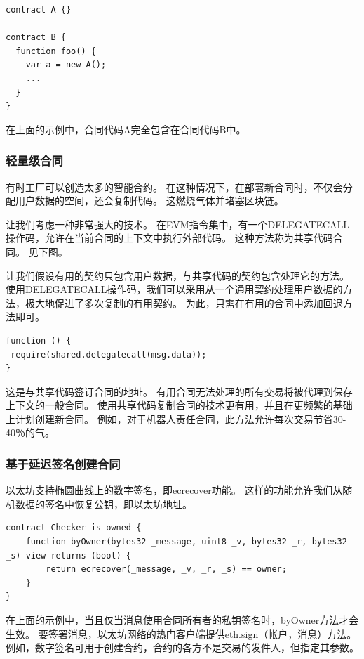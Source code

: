 \documentclass[UTF8]{article}
\begin{document}
\begin{lstlisting}
contract A {}

contract B {
  function foo() {
    var a = new A();
    ...
  }
}
\end{lstlisting}

在上面的示例中，合同代码A完全包含在合同代码B中。

\subsubsection{轻量级合同}

有时工厂可以创造太多的智能合约。 在这种情况下，在部署新合同时，不仅会分配用户数据的空间，还会复制代码。 这燃烧气体并堵塞区块链。

让我们考虑一种非常强大的技术。 在EVM指令集中，有一个DELEGATECALL操作码，允许在当前合同的上下文中执行外部代码。 这种方法称为共享代码合同。 见下图。

让我们假设有用的契约只包含用户数据，与共享代码的契约包含处理它的方法。 使用DELEGATECALL操作码，我们可以采用从一个通用契约处理用户数据的方法，极大地促进了多次复制的有用契约。 为此，只需在有用的合同中添加回退方法即可。

\begin{lstlisting}
function () {
 require(shared.delegatecall(msg.data));
}
\end{lstlisting}

这是与共享代码签订合同的地址。 有用合同无法处理的所有交易将被代理到保存上下文的一般合同。 使用共享代码复制合同的技术更有用，并且在更频繁的基础上计划创建新合同。 例如，对于机器人责任合同，此方法允许每次交易节省30-40％的气。

\subsubsection{基于延迟签名创建合同}

以太坊支持椭圆曲线上的数字签名，即ecrecover功能。 这样的功能允许我们从随机数据的签名中恢复公钥，即以太坊地址。

\begin{lstlisting}
contract Checker is owned {
    function byOwner(bytes32 _message, uint8 _v, bytes32 _r, bytes32 _s) view returns (bool) {
        return ecrecover(_message, _v, _r, _s) == owner;
    }
}
\end{lstlisting}

在上面的示例中，当且仅当消息使用合同所有者的私钥签名时，byOwner方法才会生效。 要签署消息，以太坊网络的热门客户端提供eth.sign（帐户，消息）方法。 例如，数字签名可用于创建合约，合约的各方不是交易的发件人，但指定其参数。
\end{document}

